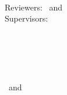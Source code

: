 


\hfill
\vfill
{
	\small
	\textbf{\thesisName} \\
	\textit{\thesisTitle} \\
	\thesisDate \\
	Reviewers: \thesisFirstReviewer\, \thesisSecondReviewer and \thesisThirdReviewer\\
	Supervisors: \thesisFirstSupervisor\ \\[1.5em]
	\textbf{\thesisUniversity} \\
	\textit{\thesisUniversityGroup} \\
	\thesisUniversityInstitute \\
	\thesisUniversityDepartment \\
	\thesisUniversityStreetAddress \\
	\thesisUniversityPostalCode\ and \thesisUniversityCity
}
